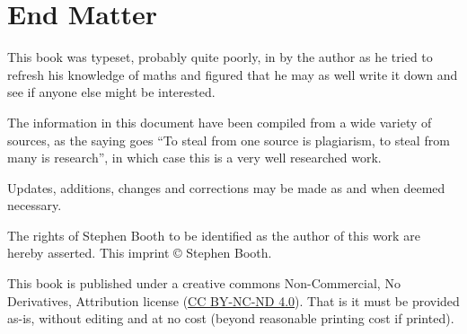 \part{End Matter} \label{End Matter}

This book was typeset, probably quite poorly, in \LaTeXe by the author as he tried to refresh his knowledge of maths and figured that he may as well write it down and see if anyone else might be interested.

The information in this document have been compiled from a wide variety of sources, as the saying goes ``To steal from one source is plagiarism, to steal from many is research'', in which case this is a very well researched work.  

Updates, additions, changes and corrections may be made as and when deemed necessary.

The rights of Stephen Booth to be identified as the author of this work are hereby asserted. This imprint \copyright {\the\year}  Stephen Booth.

This book is published under a creative commons Non-Commercial, No Derivatives, Attribution license (\href{https://creativecommons.org/licenses/by-nc-nd/4.0/}{CC BY-NC-ND 4.0}).  That is it must be provided as-is, without editing and at no cost (beyond reasonable printing cost if printed).